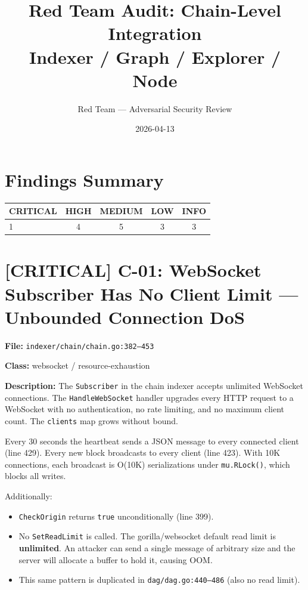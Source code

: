 \documentclass{article}
\title{Red Team Audit: Chain-Level Integration\\Indexer / Graph / Explorer / Node}
\author{Red Team --- Adversarial Security Review}
\date{2026-04-13}
\begin{document}
\maketitle

\section*{Findings Summary}

\begin{center}
\begin{tabular}{lcccc}
\toprule
\textbf{CRITICAL} & \textbf{HIGH} & \textbf{MEDIUM} & \textbf{LOW} & \textbf{INFO} \\
\midrule
1 & 4 & 5 & 3 & 3 \\
\bottomrule
\end{tabular}
\end{center}

\section{[CRITICAL] C-01: WebSocket Subscriber Has No Client Limit --- Unbounded Connection DoS}

\textbf{File:} \texttt{indexer/chain/chain.go:382--453}

\textbf{Class:} websocket / resource-exhaustion

\textbf{Description:}
The \texttt{Subscriber} in the chain indexer accepts unlimited WebSocket connections.
The \texttt{HandleWebSocket} handler upgrades every HTTP request to a WebSocket with
no authentication, no rate limiting, and no maximum client count.
The \texttt{clients} map grows without bound.

Every 30 seconds the heartbeat sends a JSON message to every connected client
(line 429). Every new block broadcasts to every client (line 423). With 10K
connections, each broadcast is O(10K) serializations under \texttt{mu.RLock()},
which blocks all writes.

Additionally:
\begin{itemize}
  \item \texttt{CheckOrigin} returns \texttt{true} unconditionally (line 399).
  \item No \texttt{SetReadLimit} is called. The gorilla/websocket default read limit
        is \textbf{unlimited}. An attacker can send a single message of arbitrary size
        and the server will allocate a buffer to hold it, causing OOM.
  \item This same pattern is duplicated in \texttt{dag/dag.go:440--486} (also no read limit).
\end{itemize}
\end{document}
